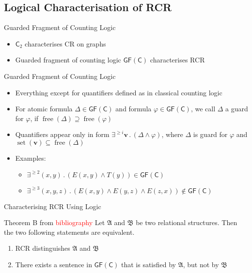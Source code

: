 \documentclass[aspectratio=169]{beamer}
\newcommand{\GFC}{\mathsf{GF}(\mathsf{C})}
\newcommand{\free}[1]{\operatorname{free}(#1)}
\newcommand{\set}{\operatorname{set}}
\newcommand{\C}[1]{\mathsf{C}_{#1}}
\renewcommand{\phi}{\varphi}
\begin{document}
	\subsection{Logical Characterisation of RCR}
	
	\begin{frame}{Guarded Fragment of Counting Logic}
		\begin{itemize}
			\item $\C{2}$ characterises CR on graphs
			\item Guarded fragment of counting logic $\GFC$ characterises RCR
		\end{itemize}
		
		\begin{block}{Guarded Fragment of Counting Logic}
			\begin{itemize}
				\item Everything except for quantifiers defined as in classical counting logic
				\item For atomic formula $\Delta\in\GFC$ and formula $\phi\in\GFC$, we call $\Delta$ a guard for $\phi$, if $\free{\Delta}\supseteq \free{\phi}$
				\item Quantifiers appear only in form $\exists^{\geq i} \mathbf v \operatorname{.} (\Delta \land \phi)$, where $\Delta$ is guard for $\phi$ and $\set(\mathbf v) \subseteq \free{\Delta}$
			\end{itemize}
		\end{block}
		\begin{itemize}
			\item Examples: 
			\begin{itemize}
				\item $\exists^{\geq 2} (x,y) \operatorname{.}(E(x,y)\land T(y))\in \GFC$
				\item $\exists^{\geq 3} (x,y,z) \operatorname{.} (E(x,y) \land E(y,z) \land E(z,x))\notin \GFC$
			\end{itemize}
		\end{itemize}
	\end{frame}
	
	\begin{frame}{Characterising RCR Using Logic}
		\begin{block}{Theorem B from \textcolor{red}{bibliography}}
			Let $\mathfrak A$ and $\mathfrak B$ be two relational structures.
			Then the two following statements are equivalent.
			\begin{enumerate}
				\item RCR distinguishes $\mathfrak A$ and $\mathfrak B$
				\item There exists a sentence in $\GFC$ that is satisfied by $\mathfrak A$, but not by $\mathfrak B$
			\end{enumerate}
		\end{block}
	\end{frame}
	
\end{document}

